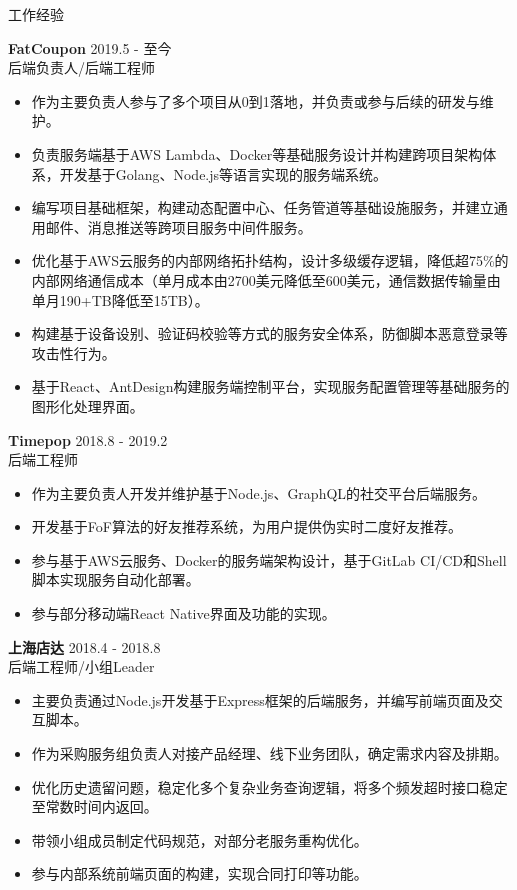 \documentclass{resume} %
\begin{document}
\begin{rSection}{工作经验}

\textbf{FatCoupon} \hfill 2019.5 - 至今\\
后端负责人/后端工程师 \hfill \textit{}
\begin{itemize}
  \itemsep -3pt {}
  \item 作为主要负责人参与了多个项目从0到1落地，并负责或参与后续的研发与维护。
  \item 负责服务端基于AWS Lambda、Docker等基础服务设计并构建跨项目架构体系，开发基于Golang、Node.js等语言实现的服务端系统。
  \item 编写项目基础框架，构建动态配置中心、任务管道等基础设施服务，并建立通用邮件、消息推送等跨项目服务中间件服务。
  \item 优化基于AWS云服务的内部网络拓扑结构，设计多级缓存逻辑，降低超75\%的内部网络通信成本（单月成本由2700美元降低至600美元，通信数据传输量由单月190+TB降低至15TB）。
  \item 构建基于设备设别、验证码校验等方式的服务安全体系，防御脚本恶意登录等攻击性行为。
  \item 基于React、AntDesign构建服务端控制平台，实现服务配置管理等基础服务的图形化处理界面。
\end{itemize}

\textbf{Timepop} \hfill 2018.8 - 2019.2\\
后端工程师 \hfill \textit{}
\begin{itemize}
  \itemsep -3pt {}
  \item 作为主要负责人开发并维护基于Node.js、GraphQL的社交平台后端服务。
  \item 开发基于FoF算法的好友推荐系统，为用户提供伪实时二度好友推荐。
  \item 参与基于AWS云服务、Docker的服务端架构设计，基于GitLab CI/CD和Shell脚本实现服务自动化部署。
  \item 参与部分移动端React Native界面及功能的实现。
\end{itemize}

\textbf{上海店达} \hfill 2018.4 - 2018.8\\
后端工程师/小组Leader \hfill \textit{}
\begin{itemize}
  \itemsep -3pt {}
  \item 主要负责通过Node.js开发基于Express框架的后端服务，并编写前端页面及交互脚本。
  \item 作为采购服务组负责人对接产品经理、线下业务团队，确定需求内容及排期。
  \item 优化历史遗留问题，稳定化多个复杂业务查询逻辑，将多个频发超时接口稳定至常数时间内返回。
  \item 带领小组成员制定代码规范，对部分老服务重构优化。
  \item 参与内部系统前端页面的构建，实现合同打印等功能。
\end{itemize}


\end{rSection}
\end{document}
